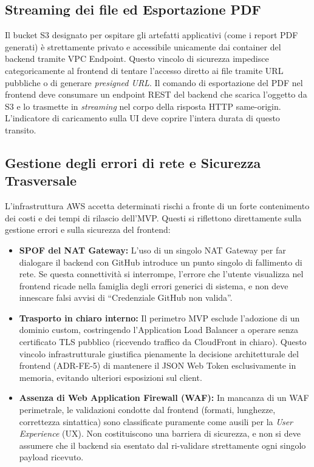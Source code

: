 \documentclass[11pt,a4paper]{article}
\begin{document}
\subsection{Streaming dei file ed Esportazione PDF}

Il bucket S3 designato per ospitare gli artefatti applicativi (come i report PDF generati) è strettamente privato e accessibile unicamente dai container del backend tramite VPC Endpoint. Questo vincolo di sicurezza impedisce categoricamente al frontend di tentare l'accesso diretto ai file tramite URL pubbliche o di generare \emph{presigned URL}. Il comando di esportazione del PDF nel frontend deve consumare un endpoint REST del backend che scarica l'oggetto da S3 e lo trasmette in \emph{streaming} nel corpo della risposta HTTP same-origin. L'indicatore di caricamento sulla UI deve coprire l'intera durata di questo transito.

\subsection{Gestione degli errori di rete e Sicurezza Trasversale}
\label{sec:fe-vincoli-rete}

L'infrastruttura AWS accetta determinati rischi a fronte di un forte contenimento dei costi e dei tempi di rilascio dell'MVP. Questi si riflettono direttamente sulla gestione errori e sulla sicurezza del frontend:

\begin{itemize}
    \item \textbf{SPOF del NAT Gateway:} L'uso di un singolo NAT Gateway per far dialogare il backend con GitHub introduce un punto singolo di fallimento di rete. Se questa connettività si interrompe, l'errore che l'utente visualizza nel frontend ricade nella famiglia degli errori generici di sistema, e non deve innescare falsi avvisi di ``Credenziale GitHub non valida''.
    \item \textbf{Trasporto in chiaro interno:} Il perimetro MVP esclude l'adozione di un dominio custom, costringendo l'Application Load Balancer a operare senza certificato TLS pubblico (ricevendo traffico da CloudFront in chiaro). Questo vincolo infrastrutturale giustifica pienamente la decisione architetturale del frontend (ADR-FE-5) di mantenere il JSON Web Token esclusivamente in memoria, evitando ulteriori esposizioni sul client.
    \item \textbf{Assenza di Web Application Firewall (WAF):} In mancanza di un WAF perimetrale, le validazioni condotte dal frontend (formati, lunghezze, correttezza sintattica) sono classificate puramente come ausili per la \emph{User Experience} (UX). Non costituiscono una barriera di sicurezza, e non si deve assumere che il backend sia esentato dal ri-validare strettamente ogni singolo payload ricevuto.
\end{itemize}
\end{document}
